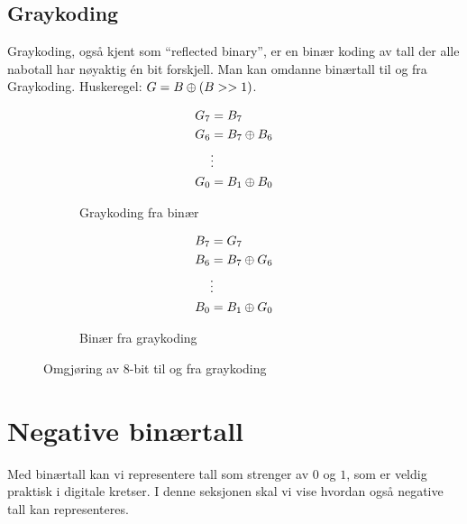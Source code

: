 \documentclass[12pt,a4paper,norsk]{article}
\begin{document}
\subsection{Graykoding}
Graykoding, også kjent som ``reflected binary'', er en binær koding av tall der alle
nabotall har nøyaktig én bit forskjell. Man kan omdanne binærtall til og fra
Graykoding. Huskeregel: $G = B \oplus (B >> 1)$.
\begin{figure}[H]
  \centering
  \begin{subfigure}{.4\textwidth}
    \centering
    \begin{align*}
      G_{7} &= B_{7} \\
      G_{6} &= B_{7} \oplus B_{6} \\
            &\vdots \\
      G_{0} &= B_{1} \oplus B_{0} \\
    \end{align*}
    \caption{Graykoding fra binær}
  \end{subfigure}
  \begin{subfigure}{.4\textwidth}
    \centering
    \begin{align*}
      B_{7} &= G_{7} \\
      B_{6} &= B_{7} \oplus G_{6} \\
            &\vdots \\
      B_{0} &= B_{1} \oplus G_{0} \\
    \end{align*}
    \caption{Binær fra graykoding}
  \end{subfigure}
  \caption{Omgjøring av 8-bit til og fra graykoding}
\end{figure}

\section{Negative binærtall}
Med binærtall kan vi representere tall som strenger av $0$ og $1$, som er veldig
praktisk i digitale kretser. I denne seksjonen skal vi vise hvordan også
negative tall kan representeres.
\end{document}

